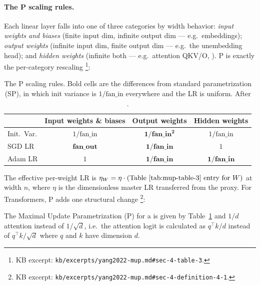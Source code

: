 \paragraph{The \textmu P scaling rules.}
Each linear layer falls into one of three categories by width
behavior: \emph{input weights and biases} (finite input dim, infinite
output dim --- e.g.\ embeddings); \emph{output weights} (infinite
input dim, finite output dim --- e.g.\ the unembedding head); and
\emph{hidden weights} (infinite both --- e.g.\ attention QKV/O,
). \textmu P is exactly the per-category rescaling
\citep[\S 4, Table 3]{yang2022-mup}\footnote{KB excerpt:
\nolinkurl{kb/excerpts/yang2022-mup.md#sec-4-table-3}.}:

\begin{table}[h]
\centering
\small
\begin{tabular}{lccc}
\toprule
                  & Input weights \& biases & Output weights         & Hidden weights \\
\midrule
Init.\ Var.       & $1/\text{fan\_in}$       & $\mathbf{1/\text{fan\_in}^{2}}$ & $1/\text{fan\_in}$ \\
SGD LR            & $\mathbf{\text{fan\_out}}$ & $\mathbf{1/\text{fan\_in}}$    & $1$ \\
Adam LR           & $1$                       & $\mathbf{1/\text{fan\_in}}$    & $\mathbf{1/\text{fan\_in}}$ \\
\bottomrule
\end{tabular}
\caption{The \textmu P scaling rules. Bold cells are the differences
from standard parametrization (SP), in which init variance is
$1/\text{fan\_in}$ everywhere and the LR is uniform. After
\citet[\S 4, Table 3]{yang2022-mup}.}
\label{tab:mup-table-3}
\end{table}

The effective per-weight LR is $\eta_W = \eta \cdot
(\text{Table~\ref{tab:mup-table-3} entry for } W)$ at width $n$, where
$\eta$ is the dimensionless master LR transferred from the proxy.
For Transformers, \textmu P adds one structural change
\citep[\S 4, Definition 4.1]{yang2022-mup}\footnote{KB excerpt:
\nolinkurl{kb/excerpts/yang2022-mup.md#sec-4-definition-4-1}.}:

\begin{definition}
The Maximal Update Parametrization (\textmu P) for a  is
given by Table~\ref{tab:mup-table-3} and $1/d$ attention instead of
$1/\sqrt{d}$, i.e.\ the attention logit is calculated as $q^\top k / d$
instead of $q^\top k / \sqrt{d}$ where  $q$ and  $k$ have
dimension $d$.
\end{definition}

